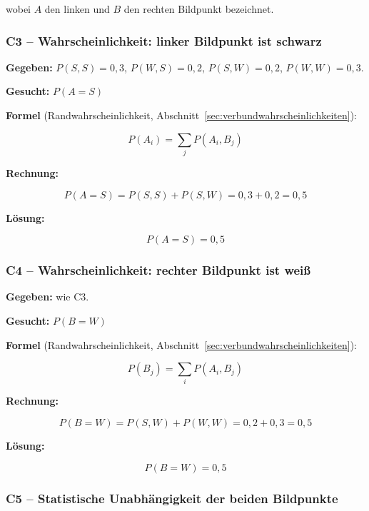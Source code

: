 wobei $A$ den linken und $B$ den rechten Bildpunkt bezeichnet.

\subsubsection*{C3 – Wahrscheinlichkeit: linker Bildpunkt ist schwarz}

\begin{beispiel}

\textbf{Gegeben:} $P(S,S) = 0{,}3$,\; $P(W,S) = 0{,}2$,\; $P(S,W) = 0{,}2$,\; $P(W,W) = 0{,}3$.

\textbf{Gesucht:} $P(A = S)$

\textbf{Formel} (Randwahrscheinlichkeit, Abschnitt~\ref{sec:verbundwahrscheinlichkeiten}):

$$
P(A_i) = \sum_{j} P(A_i, B_j)
$$

\textbf{Rechnung:}

$$
P(A = S) = P(S,S) + P(S,W) = 0{,}3 + 0{,}2 = 0{,}5
$$

\textbf{Lösung:}

$$
\boxed{P(A = S) = 0{,}5}
$$

\end{beispiel}

\subsubsection*{C4 – Wahrscheinlichkeit: rechter Bildpunkt ist weiß}

\begin{beispiel}

\textbf{Gegeben:} wie C3.

\textbf{Gesucht:} $P(B = W)$

\textbf{Formel} (Randwahrscheinlichkeit, Abschnitt~\ref{sec:verbundwahrscheinlichkeiten}):

$$
P(B_j) = \sum_{i} P(A_i, B_j)
$$

\textbf{Rechnung:}

$$
P(B = W) = P(S,W) + P(W,W) = 0{,}2 + 0{,}3 = 0{,}5
$$

\textbf{Lösung:}

$$
\boxed{P(B = W) = 0{,}5}
$$

\end{beispiel}

\subsubsection*{C5 – Statistische Unabhängigkeit der beiden Bildpunkte}

